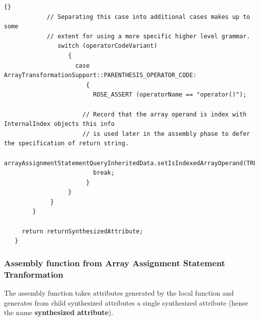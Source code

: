 \documentclass[10pt]{article}
\begin{document}
\begin{lstlisting}{}
            // Separating this case into additional cases makes up to some 
            // extent for using a more specific higher level grammar.
               switch (operatorCodeVariant)
                  {
                    case ArrayTransformationSupport::PARENTHESIS_OPERATOR_CODE:
                       {
                         ROSE_ASSERT (operatorName == "operator()");

                      // Record that the array operand is index with InternalIndex objects this info
                      // is used later in the assembly phase to defer the specification of return string.
                         arrayAssignmentStatementQueryInheritedData.setIsIndexedArrayOperand(TRUE);
                         break;
                       }
                  }
             }
        }

     return returnSynthesizedAttribute;
   }

\end{lstlisting}

\subsubsection{Assembly function from Array Assignment Statement Tranformation}

The assembly function takes attributes generated by the local function and generates from child
synthesized attributes a single synthesized attribute (hense the name {\bf synthesized attribute}).

\vspace{0.5in}
\end{document}
